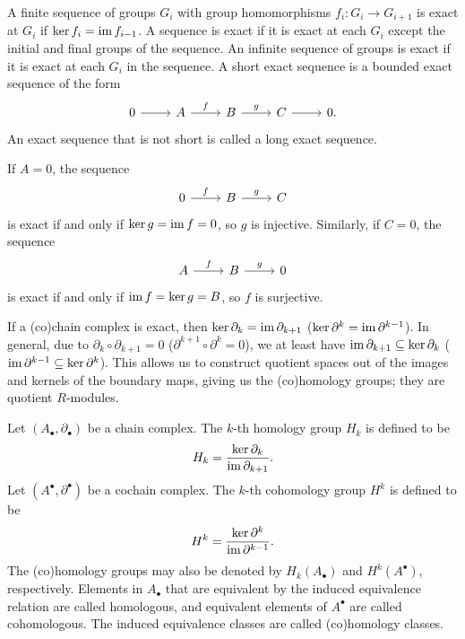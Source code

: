 \documentclass[a4paper,12pt]{article}
\begin{document}
\begin{definition}\label{def:exact_sequence}
    A finite sequence of groups $G_i$ with group homomorphisms $f_i \colon G_i \to G_{i+1}$ is exact at $G_i$ if $\ker f_i = \operatorname{im} f_{i-1}$.
    A sequence is exact if it is exact at each $G_i$ except the initial and final groups of the sequence.
    An infinite sequence of groups is exact if it is exact at each $G_i$ in the sequence.
    A short exact sequence is a bounded exact sequence of the form
    \[\begin{tikzcd}
	0 & A & B & C & 0.
	\arrow[from=1-1, to=1-2]
	\arrow["f", from=1-2, to=1-3]
	\arrow["g", from=1-3, to=1-4]
	\arrow[from=1-4, to=1-5]
    \end{tikzcd}\]
    An exact sequence that is not short is called a long exact sequence.
\end{definition}
\begin{remark}
    If $A = 0$, the sequence
    \[\begin{tikzcd}
	0 & B & C
	\arrow["f", from=1-1, to=1-2]
	\arrow["g", from=1-2, to=1-3]
    \end{tikzcd}\]
    is exact if and only if $\ker g = \operatorname{im} f = 0$, so $g$ is injective.
    Similarly, if $C = 0$, the sequence
    \[\begin{tikzcd}
	A & B & 0
	\arrow["f", from=1-1, to=1-2]
	\arrow["g", from=1-2, to=1-3]
    \end{tikzcd}\]
    is exact if and only if $\operatorname{im} f = \ker g = B$, so $f$ is surjective.
\end{remark}
If a (co)chain complex is exact, then $\ker \partial_k = \operatorname{im} \partial_{k+1}$ ($\ker \partial^k = \operatorname{im} \partial^{k-1}$).
In general, due to $\partial_k \circ \partial_{k+1} = 0$ ($\partial^{k+1} \circ \partial^k = 0$), we at least have $\operatorname{im} \partial_{k+1} \subseteq \ker \partial_k$ ($\operatorname{im} \partial^{k-1} \subseteq \ker \partial^k$).
This allows us to construct quotient spaces out of the images and kernels of the boundary maps, giving us the (co)homology groups; they are quotient $R$-modules.
\begin{definition}[(Co)Homology]\label{def:(co)homology}
    Let $(A_\bullet, \partial_\bullet)$ be a chain complex.
    The $k$-th homology group $H_k$ is defined to be
    \begin{equation}
        H_k = \frac{\ker \partial_k}{\operatorname{im} \partial_{k+1}}.
    \end{equation}
    Let $(A^\bullet, \partial^\bullet)$ be a cochain complex.
    The $k$-th cohomology group $H^k$ is defined to be
    \begin{equation}
        H^k = \frac{\ker \partial^k}{\operatorname{im} \partial^{k-1}}.
    \end{equation}
    The (co)homology groups may also be denoted by $H_k(A_\bullet)$ and $H^k(A^\bullet)$, respectively.
    Elements in $A_\bullet$ that are equivalent by the induced equivalence relation are called homologous, and equivalent elements of $A^\bullet$ are called cohomologous.
    The induced equivalence classes are called (co)homology classes.
\end{definition}
\end{document}
